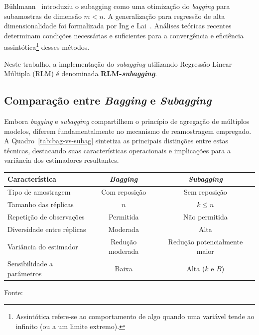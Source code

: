 Bühlmann~\cite{Buhlmann2003} introduziu o subagging como uma otimização do \textit{bagging} para
subamostras de dimensão $m < n$. A generalização para regressão de alta dimensionalidade foi 
formalizada por Ing e Lai~\cite{Ing2016}. Análises teóricas recentes~\cite{shi2021,revelas2024}
determinam condições necessárias e suficientes para a convergência e eficiência assintótica\footnote{Assintótica refere-se ao comportamento de algo quando uma variável tende ao infinito (ou a um limite extremo).} 
desses métodos.

Neste trabalho, a implementação do \textit{subagging} utilizando Regressão Linear Múltipla (RLM) é denominada \textbf{RLM-\textit{subagging}}.

\subsection{Comparação entre \textit{Bagging} e \textit{Subagging}}
\label{sec:bagxsuagg}

Embora \textit{bagging} e \textit{subagging} compartilhem o princípio de agregação de múltiplos modelos, diferem fundamentalmente no mecanismo de reamostragem empregado. A Quadro~\ref{tab:bag-vs-subag} sintetiza as principais distinções entre estas técnicas, destacando suas características operacionais e implicações para a variância dos estimadores resultantes.

\begin{quadro}[ht]
\centering
\caption{Características comparativas entre \textit{bagging} e \textit{subagging}.}
\label{tab:bag-vs-subag}
\begin{tabular}{|l|c|c|}
\hline %
\textbf{Característica} & \textbf{\textit{Bagging}} & \textbf{\textit{Subagging}} \\
\hline %
Tipo de amostragem & Com reposição & Sem reposição \\
Tamanho das réplicas & $n$ & $k \leq n$ \\
Repetição de observações & Permitida & Não permitida \\
Diversidade entre réplicas & Moderada & Alta \\
Variância do estimador & Redução moderada & Redução potencialmente maior \\
Sensibilidade a parâmetros & Baixa & Alta ($k$ e $B$) \\
\hline %
\end{tabular}
\par\vspace{3pt}
{\footnotesize Fonte: \oautor}
\end{quadro}


